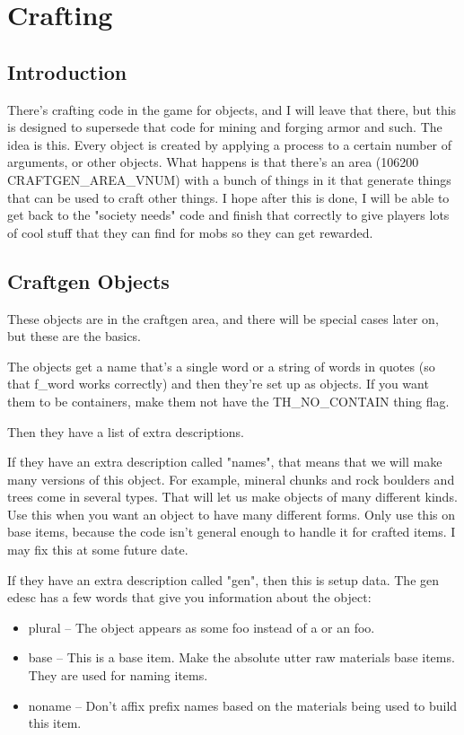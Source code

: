 \chapter{Crafting}

\section{Introduction}

There's crafting code in the game for objects, and I will leave that there,
but this is designed to supersede that code for mining and forging armor
and such. The idea is this. Every object is created by applying a process
to a certain number of arguments, or other objects. What happens is that
there's an area (106200 CRAFTGEN\_AREA\_VNUM) with a bunch of things
in it that generate things that can be used to craft other things. I hope
after this is done, I will be able to get back to the "society needs"
code and finish that correctly to give players lots of cool stuff that
they can find for mobs so they can get rewarded.


\section{Craftgen Objects}

These objects are in the craftgen area, and there will be special cases
later on, but these are the basics.

The objects get a name that's a single word or a string of words in quotes (so
that f\_word works correctly) and then they're set up as objects. If
you want them to be containers, make them not have the TH\_NO\_CONTAIN 
thing flag. 

Then they have a list of extra descriptions.

If they have an extra description called "names", that means that we will
make many versions of this object. For example, mineral chunks and
rock boulders and trees come in several types. That will let us make
objects of many different kinds. Use this when you want an object to
have many different forms. Only use this on base items, because the
code isn't general enough to handle it for crafted items. I may fix
this at some future date.

If they have an extra description called "gen", then this is setup data.
The gen edesc has a few words that give you information about the object:

\begin{itemize}

\item plural -- The object appears as some foo instead of a or an foo.

\item base -- This is a base item. Make the absolute utter raw materials base
  items. They are used for naming items.

\item noname -- Don't affix prefix names based on the materials being used to
  build this item. 

\end{itemize}


